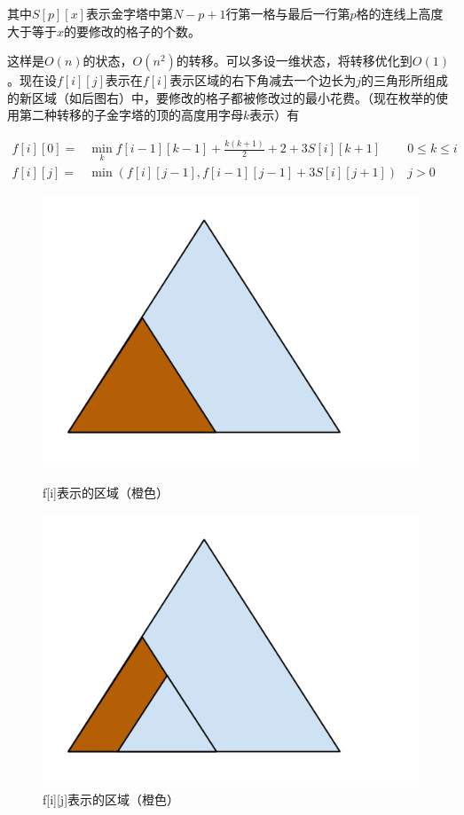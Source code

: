 \documentclass[UTF8]{ctexart}
\theoremstyle{nonumberplain}
\begin{document}
			其中$S[p][x]$表示金字塔中第$N-p+1$行第一格与最后一行第$p$格的连线上高度大于等于$x$的要修改的格子的个数。
			
			这样是$O(n)$的状态，$O(n^2)$的转移。可以多设一维状态，将转移优化到$O(1)$。现在设$f[i][j]$表示在$f[i]$表示区域的右下角减去一个边长为$j$的三角形所组成的新区域（如后图右）中，要修改的格子都被修改过的最小花费。（现在枚举的使用第二种转移的子金字塔的顶的高度用字母$k$表示）有
			
			$$ \begin{aligned}
				f[i][0] = & \min_k f[i-1][k-1]+\frac{k(k+1)}{2}+2+3 S[i][k+1] & 0 \leq k \leq i \\
				f[i][j] = & \min(f[i][j-1],f[i-1][j-1]+3 S[i][j+1]) & j>0
			\end{aligned}$$
			
			\begin{figure}[ht]
				\centering
				\begin{minipage}{.45\textwidth}
					\centering
					\includegraphics[width=\textwidth]{fig354d_2.png}
					\caption{f[i]表示的区域（橙色）}
				\end{minipage}
				\begin{minipage}{.45\textwidth}
					\centering
					\includegraphics[width=\textwidth]{fig354d_3.png}
					\caption{f[i][j]表示的区域（橙色）}
				\end{minipage}
			\end{figure}
			
\end{document}
